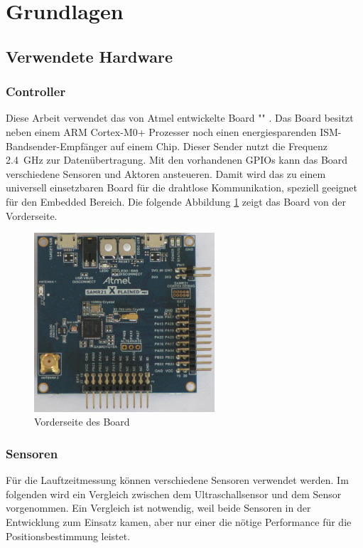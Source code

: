 \newpage
\section{Grundlagen}

\subsection{Verwendete Hardware}
\subsubsection{Controller}
Diese Arbeit verwendet das von Atmel entwickelte Board "\board" \cite{src_SAMR}. Das Board besitzt neben einem ARM Cortex-M0+ Prozesser noch einen energiesparenden ISM-Bandsender-Empfänger auf einem Chip. Dieser Sender nutzt die Frequenz \SI{2,4}{\giga \hertz} zur Datenübertragung. Mit den vorhandenen GPIOs kann das Board verschiedene Sensoren und Aktoren ansteueren. Damit wird das \board \platz zu einem universell einsetzbaren Board für die drahtlose Kommunikation, speziell geeignet für den Embedded Bereich. Die folgende Abbildung \ref{img:samr21} zeigt das \board Board von der Vorderseite.
\begin{figure}[!ht]
	\centering
	\includegraphics[width=0.6\textwidth]{images/samr21.png}
	\caption{Vorderseite des \board Board}
	\label{img:samr21}
\end{figure}

\subsubsection{Sensoren}
Für die Lauftzeitmessung können verschiedene Sensoren verwendet werden. Im folgenden wird ein Vergleich zwischen dem Ultraschallsensor \ultraschall \platz und dem \microphone \platz Sensor vorgenommen. Ein Vergleich ist notwendig, weil beide Sensoren in der Entwicklung zum Einsatz kamen, aber nur einer die nötige Performance für die Positionsbestimmung leistet.

